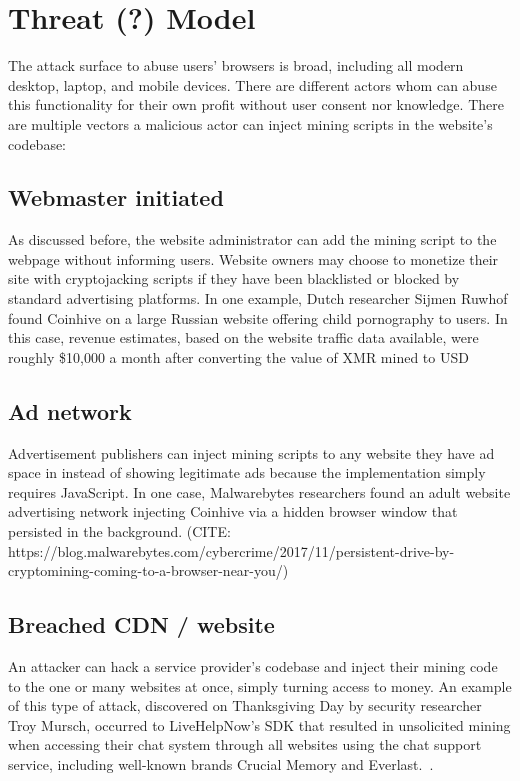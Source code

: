 
\section{Threat (?) Model}
The attack surface to abuse users' browsers is broad, including all modern desktop, laptop, and mobile devices. There are different actors whom can abuse this functionality for their own profit without user consent nor knowledge. There are multiple vectors a malicious actor can inject mining scripts in the website's codebase:

\subsection{Webmaster initiated} 

As discussed before, the website administrator can add the mining script to the webpage without informing users. Website owners may choose to monetize their site with cryptojacking scripts if they have been blacklisted or blocked by standard advertising platforms. In one example, Dutch researcher Sijmen Ruwhof found Coinhive on a large Russian website offering child pornography to users. In this case, revenue estimates, based on the website traffic data available, were roughly \$10,000 a month after converting the value of XMR mined to USD~\cite{coinhiveonchildporn}

\subsection{Ad network} 

Advertisement publishers can inject mining scripts to any website they have ad space in instead of showing legitimate ads because the implementation simply requires JavaScript. In one case, Malwarebytes researchers found an adult website advertising network injecting Coinhive via a hidden browser window that persisted in the background. (CITE: https://blog.malwarebytes.com/cybercrime/2017/11/persistent-drive-by-cryptomining-coming-to-a-browser-near-you/)

\subsection{Breached CDN / website} 
An attacker can hack a service provider's codebase and inject their mining code to the one or many websites at once, simply turning access to money. An example of this type of attack, discovered on Thanksgiving Day by security researcher Troy Mursch, occurred to LiveHelpNow's SDK that resulted in unsolicited mining when accessing their chat system through all websites using the chat support service, including well-known brands Crucial Memory and Everlast.~\cite{chatsupporthack}.

